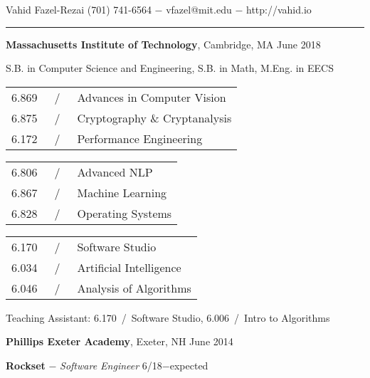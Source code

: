\documentclass[11pt]{article}
\newcommand{\msection}[1]{\vspace{1em}\marginnote{#1}} %
\newcommand{\bt}[1]{\textbf{#1}} %
\newcommand{\gap}[0]{\vspace{0.7em}} %
\newcommand{\sgap}[0]{\vspace{0.2em}} %
\newcommand{\dash}[0]{ $-$ } %
\newcommand{\tabsep}[0]{\, / \,} %
\begin{document}

{\Huge Vahid Fazel-Rezai} \hfill  (701) 741-6564\dash vfazel@mit.edu\dash http://vahid.io

\vspace{0.4em}

\hspace{-1.2in}\rule{7.9in}{0.2em}

\vspace{-0.2em}



\msection{Education}

\bt{Massachusetts Institute of Technology}, Cambridge, MA \hfill June 2018

S.B. in Computer Science and Engineering, S.B. in Math, M.Eng. in EECS

\sgap

\vspace{0.15em}
\begin{tabular}{rcl}
6.869 & \tabsep & Advances in Computer Vision \\
6.875 & \tabsep & Cryptography \& Cryptanalysis \\
6.172 & \tabsep & Performance Engineering \\
\end{tabular}
\hfill
\begin{tabular}{rcl}
6.806 & \tabsep & Advanced NLP \\
6.867 & \tabsep & Machine Learning \\
6.828 & \tabsep & Operating Systems \\
\end{tabular}
\hfill
\begin{tabular}{rcl}
6.170 & \tabsep & Software Studio \\
6.034 & \tabsep & Artificial Intelligence \\
6.046 & \tabsep & Analysis of Algorithms \\
\end{tabular}

\sgap

Teaching Assistant: 6.170\tabsep Software Studio, 6.006\tabsep Intro to Algorithms

\gap

\bt{Phillips Exeter Academy}, Exeter, NH \hfill June 2014



\msection{Work}

\bt{Rockset}\dash \emph{Software Engineer} \hfill 6/18$-$expected
\end{document}
